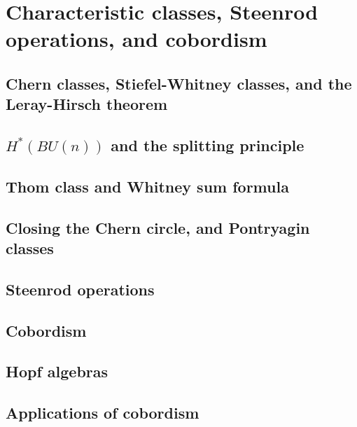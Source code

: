 \documentclass[oneside]{amsbook}
\numberwithin{ex}{section}
\begin{document}
\chapter{Characteristic classes, Steenrod operations, and cobordism}
\section{Chern classes, Stiefel-Whitney classes, and the Leray-Hirsch theorem}

\section{$H^*(BU(n))$ and the splitting principle}

\section{Thom class and Whitney sum formula}

\section{Closing the Chern circle, and Pontryagin classes}

\section{Steenrod operations}

\section{Cobordism}

\section{Hopf algebras}

\section{Applications of cobordism}

\end{document}
